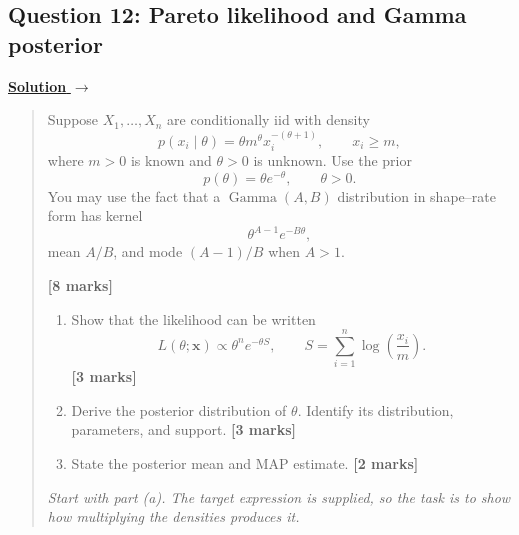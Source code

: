 \documentclass[11pt,a4paper]{article}
\newcommand{\given}{\mathrel{|}}
\newcommand{\xvec}{\boldsymbol{x}}
\newenvironment{examquestion}[2]
  {\subsection{#1}\label{question:\arabic{subsection}}\label{#2}%
   \noindent\hyperref[answer:\arabic{subsection}]{\textbf{Solution} $\rightarrow$}%
   \begin{quote}\color{statgrey}}
  {\end{quote}}
\begin{document}
\clearpage

\begin{examquestion}{Question 12: Pareto likelihood and Gamma posterior}{question:practice-pareto-likelihood-and-gamma-posterior}
Suppose $X_1,\ldots,X_n$ are conditionally iid with density
\[
  p(x_i\given\theta)
  =\theta m^\theta x_i^{-(\theta+1)},
  \qquad x_i\geq m,
\]
where $m>0$ is known and $\theta>0$ is unknown. Use the prior
\[
  p(\theta)=\theta e^{-\theta},
  \qquad \theta>0.
\]
You may use the fact that a $\operatorname{Gamma}(A,B)$ distribution in
shape--rate form has kernel
\[
  \theta^{A-1}e^{-B\theta},
\]
mean $A/B$, and mode $(A-1)/B$ when $A>1$.

\textbf{[8 marks]}

\begin{enumerate}[label=(\alph*)]
  \item Show that the likelihood can be written
        \[
          L(\theta;\xvec)\propto\theta^n e^{-\theta S},
          \qquad
          S=\sum_{i=1}^n\log\left(\frac{x_i}{m}\right).
        \]
        \textbf{[3 marks]}

  \item Derive the posterior distribution of $\theta$. Identify its
        distribution, parameters, and support. \textbf{[3 marks]}

  \item State the posterior mean and MAP estimate. \textbf{[2 marks]}
\end{enumerate}

\medskip
\noindent\emph{Start with part (a). The target expression is supplied, so
the task is to show how multiplying the densities produces it.}
\end{examquestion}

\clearpage
\end{document}
